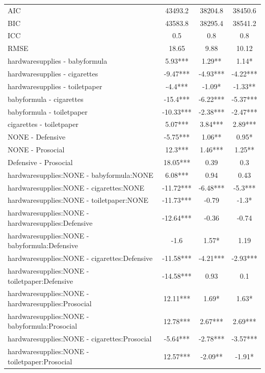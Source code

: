 \documentclass[]{report}
\begin{document}
\begin{longtable}{lccc}
			AIC & \num{43493.2} & \num{38204.8} & \num{38450.6}\\
			BIC & \num{43583.8} & \num{38295.4} & \num{38541.2}\\
			ICC & \num{0.5} & \num{0.8} & \num{0.8}\\
			RMSE & \num{18.65} & \num{9.88} & \num{10.12}\\
			\hline
			hardwaresupplies - babyformula & 5.93*** & 1.29** & 1.14* \\ 
			hardwaresupplies - cigarettes & -9.47*** & -4.93*** & -4.22*** \\ 
			hardwaresupplies - toiletpaper & -4.4*** & -1.09* & -1.33** \\ 
			babyformula - cigarettes & -15.4*** & -6.22*** & -5.37*** \\ 
			babyformula - toiletpaper & -10.33*** & -2.38*** & -2.47*** \\ 
			cigarettes - toiletpaper & 5.07*** & 3.84*** & 2.89*** \\ 
			NONE - Defensive & -5.75*** & 1.06** & 0.95* \\ 
			NONE - Prosocial & 12.3*** & 1.46*** & 1.25** \\ 
			Defensive - Prosocial & 18.05*** & 0.39 & 0.3 \\ 
			hardwaresupplies:NONE - babyformula:NONE & 6.08*** & 0.94 & 0.43 \\ 
			hardwaresupplies:NONE - cigarettes:NONE & -11.72*** & -6.48*** & -5.3*** \\ 
			hardwaresupplies:NONE - toiletpaper:NONE & -11.73*** & -0.79 & -1.3* \\ 
			hardwaresupplies:NONE - hardwaresupplies:Defensive & -12.64*** & -0.36 & -0.74 \\ 
			hardwaresupplies:NONE - babyformula:Defensive & -1.6 & 1.57* & 1.19 \\ 
			hardwaresupplies:NONE - cigarettes:Defensive & -11.58*** & -4.21*** & -2.93*** \\ 
			hardwaresupplies:NONE - toiletpaper:Defensive & -14.58*** & 0.93 & 0.1 \\ 
			hardwaresupplies:NONE - hardwaresupplies:Prosocial & 12.11*** & 1.69* & 1.63* \\ 
			hardwaresupplies:NONE - babyformula:Prosocial & 12.78*** & 2.67*** & 2.69*** \\ 
			hardwaresupplies:NONE - cigarettes:Prosocial & -5.64*** & -2.78*** & -3.57*** \\ 
			hardwaresupplies:NONE - toiletpaper:Prosocial & 12.57*** & -2.09** & -1.91* \\ 

\end{longtable}
\end{document}
